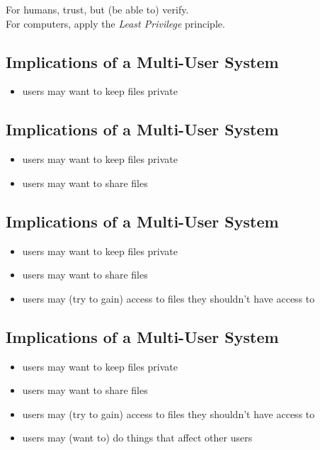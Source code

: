 \documentclass[xga]{xdvislides}
\begin{document}
\vspace{.5in}
For humans, trust, but (be able to) verify. \\

\vspace{.5in}
For computers, apply the {\em Least Privilege} principle. \\
\Normalsize

\subsection{Implications of a Multi-User System}
\begin{itemize}
	\item users may want to keep files private
\end{itemize}

\subsection{Implications of a Multi-User System}
\begin{itemize}
	\item users may want to keep files private
	\item users may want to share files
\end{itemize}

\subsection{Implications of a Multi-User System}
\begin{itemize}
	\item users may want to keep files private
	\item users may want to share files
	\item users may (try to gain) access to files they shouldn't have access to
\end{itemize}

\subsection{Implications of a Multi-User System}
\begin{itemize}
	\item users may want to keep files private
	\item users may want to share files
	\item users may (try to gain) access to files they shouldn't have access to
	\item users may (want to) do things that affect other users
\end{itemize}
\end{document}
